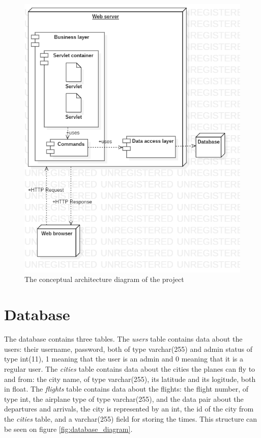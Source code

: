 \documentclass[a4paper,10pt]{report}
\begin{document}
\begin{figure}[h]
    \centering
    \includegraphics[width=1\textwidth]{architecture_diagram.png}
    \caption{The conceptual architecture diagram of the project}
    \label{fig:architecture_diagram}
\end{figure}

\section{Database}
The database contains three tables.
The \textit{users} table contains data about the users: their username, password, both of type varchar(255) and admin status of type int(11), 1 meaning that the user is an admin and 0 meaning that it is a regular user.
The \textit{cities} table contains data about the cities the planes can fly to and from: the city name, of type varchar(255), its latitude and its logitude, both in float.
The \textit{flights} table contains data about the flights: the flight number, of type int, the airplane type of type varchar(255), and the data pair about the departures and arrivals, the city is represented by an int, the id of the city from the \textit{cities} table, and a varchar(255) field for storing the times.
This structure can be seen on figure \ref{fig:database_diagram}.
\end{document}
